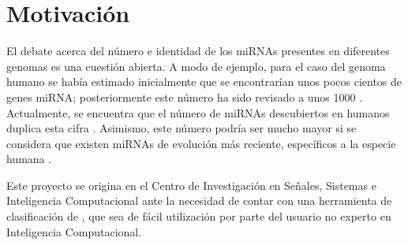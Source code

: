 %
%
%
\section{Motivación}
%
El debate acerca del número e identidad de los miRNAs presentes en
diferentes genomas es una cuestión abierta.
A modo de ejemplo, para el caso del genoma humano se había estimado
inicialmente que se encontrarían unos pocos cientos de genes miRNA;
posteriormente este número ha sido revisado a unos 1000
\cite{sewer,chang}.
Actualmente, se encuentra que el número de miRNAs descubiertos en
humanos duplica esta cifra \cite{gomes}.
Asimismo, este número podría ser mucho mayor si se considera que
existen miRNAs de evolución más reciente, específicos a la especie
humana \cite{sewer}.

Este proyecto se origina en el Centro de Investigación en Señales, 
Sistemas e Inteligencia Computacional  ante la necesidad de
contar con  una herramienta de clasificación de , que sea
de fácil utilización por parte del usuario no experto en Inteligencia
Computacional.


